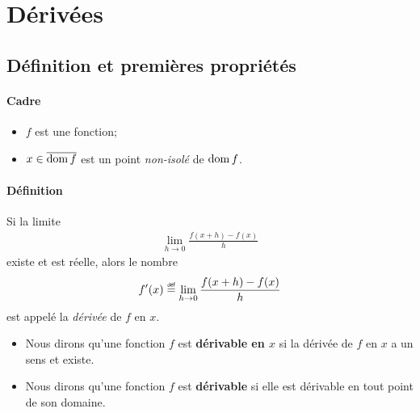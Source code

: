 \documentclass[main.tex]{subfiles}
\begin{document}
\tableofcontents

\chapter{Dérivées}

\section{Définition et premières propriétés}

\begin{definition}
    [Dérivée]

    \subsubsection*{Cadre}

    \begin{itemize}
        \item $f$ est une fonction;
        \item $x \in \overline{\operatorname{dom} f}$ est un point \emph{non-isolé} de $\operatorname{dom} f$.
    \end{itemize}

    \subsubsection*{Définition}

    Si la limite
    \begin{align}
        \lim_{h \to 0} \frac {f(x + h) - f(x)} h
    \end{align}
    existe et est réelle,
    alors le nombre
    \begin{align}
        f'(x) \defeq \lim_{h \to 0} \frac {f(x + h) - f(x)} h
    \end{align}
    est appelé la \emph{dérivée} de $f$ en $x$.
\end{definition}

\begin{remark}
    [Dérivabilité]

    \begin{itemize}
        \item Nous dirons qu'une fonction $f$ est \textbf{dérivable en $x$}
            si la dérivée de $f$ en $x$ a un sens et existe.
        \item Nous dirons qu'une fonction $f$ est \textbf{dérivable}
            si elle est dérivable en tout point de son domaine.
    \end{itemize}
\end{remark}
\end{document}
